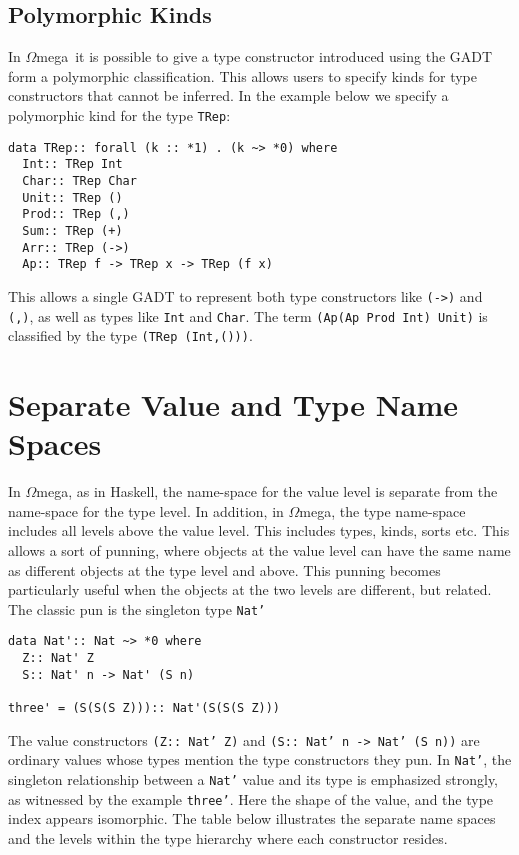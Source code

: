 \documentclass[11pt,twoside]{article}
\newcommand{\om}{$\Omega$mega}
\begin{document}
\subsection{Polymorphic Kinds}
In \om\ it is possible to give a type constructor
introduced using the GADT form a polymorphic classification.
This allows users to specify kinds
for type constructors that cannot be inferred. In the example
below we specify a polymorphic kind for the type {\tt TRep}:
\begin{verbatim} 
data TRep:: forall (k :: *1) . (k ~> *0) where
  Int:: TRep Int   
  Char:: TRep Char
  Unit:: TRep ()
  Prod:: TRep (,)
  Sum:: TRep (+)
  Arr:: TRep (->) 
  Ap:: TRep f -> TRep x -> TRep (f x)
\end{verbatim}    
This allows a single GADT to represent both type constructors like
\verb+(->)+ and \verb+(,)+, as well as types like \verb+Int+ and \verb+Char+.
The term \verb+(Ap(Ap Prod Int) Unit)+ is classified
by the type \verb+(TRep (Int,()))+.

\section{Separate Value and Type Name Spaces}

In \om, as in Haskell, the name-space for the value level is separate from the
name-space for the type level.  In addition, in \om, the type name-space
includes all levels above the value level. This includes types, kinds, sorts
etc. This allows a sort of punning, where objects at the value level can have
the same name as different objects at the type level and above. This punning
becomes particularly useful when the objects at the two levels are different,
but related. The classic pun is the singleton type {\tt Nat'}

\begin{verbatim}
data Nat':: Nat ~> *0 where
  Z:: Nat' Z
  S:: Nat' n -> Nat' (S n)
  
three' = (S(S(S Z))):: Nat'(S(S(S Z)))
\end{verbatim}

The value constructors {\tt (Z:: Nat' Z)} and {\tt (S:: Nat' n ->
Nat' (S n))} are ordinary values whose types mention the type
constructors they pun. In {\tt Nat'}, the singleton relationship
between a {\tt Nat'} value and its type is emphasized 
strongly, as witnessed by the example {\tt three'}. Here the
shape of the value, and the type index appears isomorphic. The table
below illustrates the separate name spaces and the levels within the type
hierarchy where each constructor resides.
\end{document}
